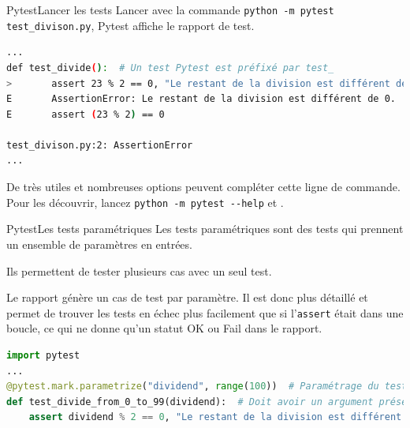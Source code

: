 \documentclass{beamer}
\begin{document}
    \begin{frame}[fragile]{Pytest}{Lancer les tests}
        \transdissolve
        Lancer avec la commande \lstinline{python -m pytest test_divison.py}, Pytest affiche le rapport de test.
        \begin{lstlisting}[language=sh]
...
def test_divide():  # Un test Pytest est préfixé par test_
>       assert 23 % 2 == 0, "Le restant de la division est différent de 0."
E       AssertionError: Le restant de la division est différent de 0.
E       assert (23 % 2) == 0

test_divison.py:2: AssertionError
...
        \end{lstlisting}

        De très utiles et nombreuses options peuvent compléter cette ligne de commande.
        Pour les découvrir, lancez \lstinline{python -m pytest --help} et .
    \end{frame}

    \begin{frame}[fragile]{Pytest}{Les tests paramétriques}
        \transdissolve
        Les tests paramétriques sont des tests qui prennent un ensemble de paramètres en entrées.

        Ils permettent de tester plusieurs cas avec un seul test.

        Le rapport génère un cas de test par paramètre.
        Il est donc plus détaillé et permet de trouver les tests en échec plus facilement que si l'\lstinline {assert} était dans une boucle, ce qui ne donne qu'un statut OK ou Fail dans le rapport.
        \begin{lstlisting}[language=Python]
import pytest
...
@pytest.mark.parametrize("dividend", range(100))  # Paramétrage du test
def test_divide_from_0_to_99(dividend):  # Doit avoir un argument présent dans le paramétrage
    assert dividend % 2 == 0, "Le restant de la division est différent de 0."
        \end{lstlisting}
    \end{frame}
\end{document}
